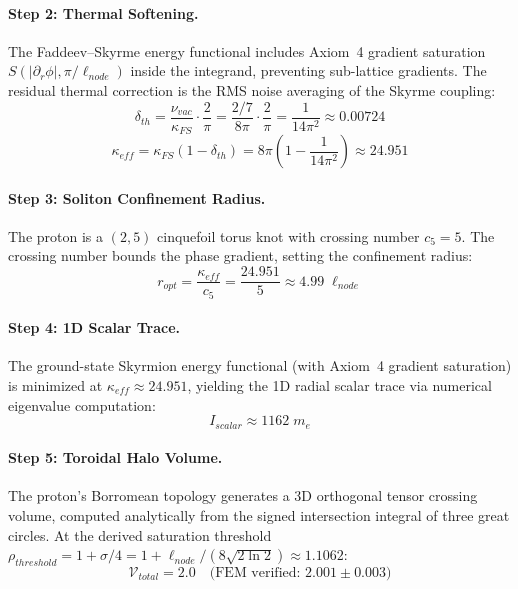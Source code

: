 \paragraph{Step 2: Thermal Softening.}
The Faddeev--Skyrme energy functional includes Axiom~4 gradient saturation
$S(|\partial_r\phi|, \pi/\ell_{node})$ inside the integrand, preventing
sub-lattice gradients.  The residual thermal correction is the RMS
noise averaging of the Skyrme coupling:
\begin{equation}
    \delta_{th} = \frac{\nu_{vac}}{\kappa_{FS}} \cdot \frac{2}{\pi}
    = \frac{2/7}{8\pi} \cdot \frac{2}{\pi}
    = \frac{1}{14\pi^2}
    \approx 0.00724
    \label{eq:delta_th}
\end{equation}
\begin{equation}
    \kappa_{eff} = \kappa_{FS}(1 - \delta_{th})
    = 8\pi\!\left(1 - \frac{1}{14\pi^2}\right)
    \approx 24.951
    \label{eq:kappa_eff}
\end{equation}

\paragraph{Step 3: Soliton Confinement Radius.}
The proton is a $(2,5)$ cinquefoil torus knot with crossing number $c_5 = 5$.
The crossing number bounds the phase gradient, setting the confinement radius:
\begin{equation}
    r_{opt} = \frac{\kappa_{eff}}{c_5}
    = \frac{24.951}{5}
    \approx 4.99\;\ell_{node}
    \label{eq:r_opt}
\end{equation}

\paragraph{Step 4: 1D Scalar Trace.}
The ground-state Skyrmion energy functional (with Axiom~4 gradient saturation)
is minimized at $\kappa_{eff} \approx 24.951$, yielding the 1D radial scalar
trace via numerical eigenvalue computation:
\begin{equation}
    I_{scalar} \approx 1162\;m_e
    \label{eq:I_scalar}
\end{equation}

\paragraph{Step 5: Toroidal Halo Volume.}
The proton's Borromean topology generates a 3D orthogonal tensor crossing
volume, computed analytically from the signed intersection integral of three
great circles. At the derived saturation threshold
$\rho_{threshold} = 1 + \sigma/4 = 1 + \ell_{node}/(8\sqrt{2\ln 2})
\approx 1.1062$:
\begin{equation}
    \mathcal{V}_{total} = 2.0
    \quad\text{(FEM verified: } 2.001 \pm 0.003\text{)}
    \label{eq:V_halo}
\end{equation}

